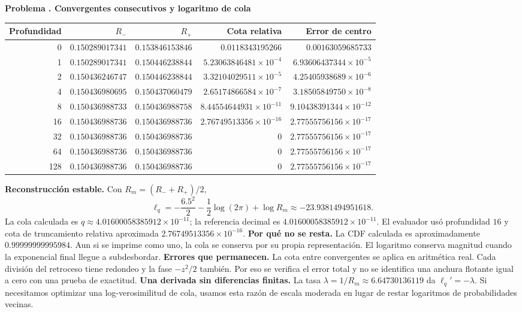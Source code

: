 \documentclass[11pt,a4paper]{article}
\theoremstyle{definition}
\newcounter{problema}
\newenvironment{resuelto}[1]{\refstepcounter{problema}\par\medskip\Needspace{6\baselineskip}\textbf{Problema \theproblema. #1}\par}{\par\medskip}
\begin{document}
\begin{resuelto}{Convergentes consecutivos y logaritmo de cola}
\begin{center}\small\begin{tabular}{rrrrr}
\toprule
Profundidad&$R_-$&$R_+$&Cota relativa&Error de centro\\
\midrule
0&$0.150289017341$&$0.153846153846$&$0.0118343195266$&$0.00163059685733$\\
1&$0.150289017341$&$0.150446238844$&$5.23063846481\times10^{-4}$&$6.93606437344\times10^{-5}$\\
2&$0.150436246747$&$0.150446238844$&$3.32104029511\times10^{-5}$&$4.25405938689\times10^{-6}$\\
4&$0.150436980695$&$0.150437060479$&$2.65174866584\times10^{-7}$&$3.18505849750\times10^{-8}$\\
8&$0.150436988733$&$0.150436988758$&$8.44554644931\times10^{-11}$&$9.10438391344\times10^{-12}$\\
16&$0.150436988736$&$0.150436988736$&$2.76749513356\times10^{-16}$&$2.77555756156\times10^{-17}$\\
32&$0.150436988736$&$0.150436988736$&$0$&$2.77555756156\times10^{-17}$\\
64&$0.150436988736$&$0.150436988736$&$0$&$2.77555756156\times10^{-17}$\\
128&$0.150436988736$&$0.150436988736$&$0$&$2.77555756156\times10^{-17}$\\
\bottomrule\end{tabular}\end{center}
\textbf{Reconstrucción estable.} Con $R_m=(R_-+R_+)/2$,
\[
\ell_q=-\frac{6.5^2}{2}-\frac12\log(2\pi)+\log R_m\approx-23.9381494951618.
\]
La cola calculada es $q\approx4.01600058385912\times10^{-11}$; la referencia decimal es $4.01600058385912\times10^{-11}$. El evaluador usó profundidad $16$ y cota de truncamiento relativa aproximada $2.76749513356\times10^{-16}$.
\textbf{Por qué no se resta.} La CDF calculada es aproximadamente $0.99999999995984$. Aun si se imprime como uno, la cola se conserva por su propia representación. El logaritmo conserva magnitud cuando la exponencial final llegue a subdesbordar.
\textbf{Errores que permanecen.} La cota entre convergentes se aplica en aritmética real. Cada división del retroceso tiene redondeo y la fase $-z^2/2$ también. Por eso se verifica el error total y no se identifica una anchura flotante igual a cero con una prueba de exactitud.
\textbf{Una derivada sin diferencias finitas.} La tasa $\lambda=1/R_m\approx6.64730136119$ da $\ell_q\prime=-\lambda$. Si necesitamos optimizar una log-verosimilitud de cola, usamos esta razón de escala moderada en lugar de restar logaritmos de probabilidades vecinas.
\end{resuelto}
\end{document}
